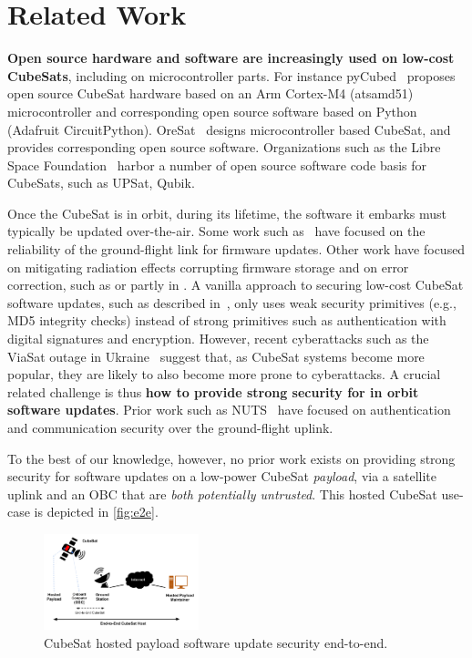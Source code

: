\section{Related Work}
\label{sec:background-related-work}

{\bf Open source hardware and software are increasingly used on low-cost CubeSats}, including on microcontroller parts.
For instance pyCubed~\cite{Holliday2019PyCubed} proposes open source CubeSat hardware based on an Arm Cortex-M4 (atsamd51)
microcontroller and corresponding open source software based on Python (Adafruit CircuitPython).
OreSat~\cite{spivey2021oresat} designs microcontroller based CubeSat, and provides corresponding open source software.
Organizations such as the Libre Space Foundation~\cite{librespace} harbor a number of open source software code basis for
CubeSats, such as UPSat, Qubik.

Once the CubeSat is in orbit, during its lifetime, the software it embarks must typically be updated over-the-air.
Some work such as~\cite{FitzsimmonsReliableSoftwareUpdates} have focused on the reliability of the ground-flight link for firmware updates.
Other work have focused on mitigating radiation effects corrupting firmware storage and on error correction, such as \cite{yuen2019low}
or partly in \cite{sunter2016updatesnano}.
A vanilla approach to securing low-cost CubeSat software updates, such as described in~\cite{maison2021otaeducubesat},
only uses weak security primitives (e.g., MD5 integrity checks) instead of strong primitives such as authentication
with digital signatures and encryption.
However, recent cyberattacks such as the ViaSat outage in Ukraine~\cite{viasat-cyberattack} suggest that, as CubeSat
systems become more popular, they are likely to also become more prone to cyberattacks.
A crucial related challenge is thus {\bf how to provide strong security for in orbit software updates}.
Prior work such as NUTS~\cite{birkeland2014nutsoverview,bezem2013nutsAuthenticatedUplink} have focused on authentication
and communication security over the ground-flight uplink.

To the best of our knowledge, however, no prior work exists on providing strong security for software updates on a low-power
CubeSat \textit{payload}, via a satellite uplink and an OBC that are \textit{both potentially untrusted}.
This hosted CubeSat use-case is depicted in \autoref{fig:e2e}.

\begin{figure}[t]
    \centering
    \includegraphics[width=0.4\textwidth]{Figures/CubeSat-Payload-End2End.png}
    \caption{CubeSat hosted payload software update security end-to-end.}
    \label{fig:e2e}
\end{figure}


